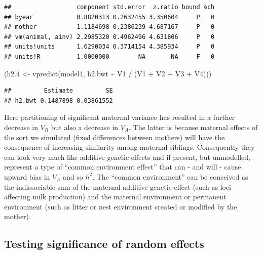 \documentclass[
  12pt,
]{book}
\newenvironment{Shaded}{\begin{snugshade}}{\end{snugshade}}
\newcommand{\FloatTok}[1]{\textcolor[rgb]{0.00,0.00,0.81}{#1}}
\newcommand{\FunctionTok}[1]{\textcolor[rgb]{0.00,0.00,0.00}{#1}}
\newcommand{\NormalTok}[1]{#1}
\newcommand{\OtherTok}[1]{\textcolor[rgb]{0.56,0.35,0.01}{#1}}
\newcommand{\SpecialCharTok}[1]{\textcolor[rgb]{0.00,0.00,0.00}{#1}}
\begin{document}
\begin{Shaded}
\end{Shaded}

\begin{verbatim}
##                  component std.error  z.ratio bound %ch
## byear            0.8820313 0.2632455 3.350604     P   0
## mother           1.1184698 0.2386239 4.687167     P   0
## vm(animal, ainv) 2.2985320 0.4962496 4.631806     P   0
## units!units      1.6290034 0.3714154 4.385934     P   0
## units!R          1.0000000        NA       NA     F   0
\end{verbatim}

\begin{Shaded}
\begin{Highlighting}[]
\NormalTok{(h2}\FloatTok{.4} \OtherTok{\textless{}{-}} \FunctionTok{vpredict}\NormalTok{(model4, h2.bwt }\SpecialCharTok{\textasciitilde{}}\NormalTok{ V1 }\SpecialCharTok{/}\NormalTok{ (V1 }\SpecialCharTok{+}\NormalTok{ V2 }\SpecialCharTok{+}\NormalTok{ V3 }\SpecialCharTok{+}\NormalTok{ V4)))}
\end{Highlighting}
\end{Shaded}

\begin{verbatim}
##         Estimate         SE
## h2.bwt 0.1487898 0.03861552
\end{verbatim}

Here partitioning of significant maternal variance has resulted in a further decrease in \(V_R\) but also a decrease in \(V_A\). The latter is because maternal effects of the sort we simulated (fixed differences between mothers) will have the consequence of increasing similarity among maternal siblings. Consequently they can look very much like additive genetic effects and if present, but unmodelled, represent a type of ``common environment effect'' that can - and will - cause upward bias in \(V_A\) and so \(h^2\).
The ``common environment'' can be conceived as the indissociable sum of the maternal additive genetic effect (such as loci affecting milk production) and the maternal environment or permanent environment (such as litter or nest environment created or modified by the mother).

\hypertarget{testing-significance-of-random-effects}{%
\subsection{Testing significance of random effects}\label{testing-significance-of-random-effects}}
\end{document}
